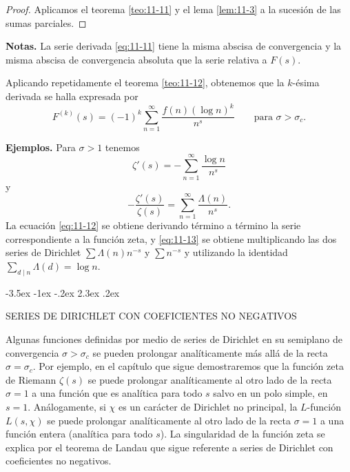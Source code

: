 \documentclass[12pt,a4paper]{book}
\makeatletter
\renewcommand\section{\@startsection{section}{1}{\z@}%
  {-3.5ex \@plus -1ex \@minus -.2ex}%
  {2.3ex \@plus .2ex}%
  {\normalfont\Large\bfseries\raggedright}}
\makeatother
\begin{document}
    \begin{proof}
        Aplicamos el teorema \ref{teo:11-11} y el lema \ref{lem:11-3} a la sucesión de las
        sumas parciales.
    \end{proof}

    \textbf{Notas.} La serie derivada \eqref{eq:11-11} tiene la misma abscisa de convergencia
    y la misma abscisa de convergencia absoluta que la serie relativa a $F(s)$.

    Aplicando repetidamente el teorema \ref{teo:11-12}, obtenemos que la $k$-ésima derivada se
    halla expresada por
    \begin{equation*}
        F^{(k)}(s)=(-1)^{k}\sum_{n=1}^{\infty}\frac{f(n)(\log n)^{k}}{n^{s}}\qquad\text{para }\sigma>\sigma_{c}.
    \end{equation*}

    \textbf{Ejemplos.} Para $\sigma>1$ tenemos
    \begin{equation}\label{eq:11-12}
        \zeta'(s)=-\sum_{n=1}^{\infty}\frac{\log n}{n^{s}}
    \end{equation}
    y
    \begin{equation}\label{eq:11-13}
        -\frac{\zeta'(s)}{\zeta(s)}=\sum_{n=1}^{\infty}\frac{\Lambda(n)}{n^{s}}.
    \end{equation}
    La ecuación \eqref{eq:11-12} se obtiene derivando término a término la serie
    correspondiente a la función zeta, y \eqref{eq:11-13} se obtiene multiplicando las dos
    series de Dirichlet $\sum\Lambda(n)n^{-s}$ y $\sum n^{-s}$ y utilizando la identidad
    $\sum_{d\mid n}\Lambda(d)=\log n$.

    \section{SERIES DE DIRICHLET CON COEFICIENTES NO NEGATIVOS}

    Algunas funciones definidas por medio de series de Dirichlet en su semiplano de
    convergencia $\sigma>\sigma_{c}$ se pueden prolongar analíticamente más allá de la recta
    $\sigma=\sigma_{c}$. Por ejemplo, en el capítulo que sigue demostraremos que la función zeta
    de Riemann $\zeta(s)$ se puede prolongar analíticamente al otro lado de la recta
    $\sigma=1$ a una función que es analítica para todo $s$ salvo en un polo simple, en
    $s=1$. Análogamente, si $\chi$ es un carácter de Dirichlet no principal, la $L$-función
    $L(s,\chi)$ se puede prolongar analíticamente al otro lado de la recta $\sigma=1$ a una
    función entera (analítica para todo $s$). La singularidad de la función zeta se explica
    por el teorema de Landau que sigue referente a series de Dirichlet con coeficientes no
    negativos.
\end{document}
